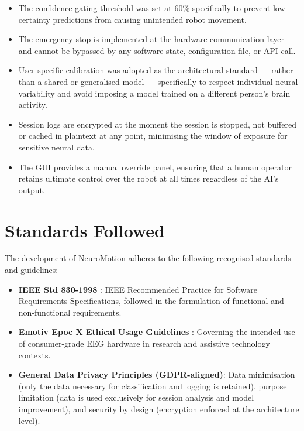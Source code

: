 \documentclass[12pt, a4paper, oneside]{report}
\begin{document}
\begin{description}
\begin{itemize}
    \item The confidence gating threshold was set at 60\% specifically to prevent
    low-certainty predictions from causing unintended robot movement.

    \item The emergency stop is implemented at the hardware communication layer and
    cannot be bypassed by any software state, configuration file, or API call.

    \item User-specific calibration was adopted as the architectural standard ---
    rather than a shared or generalised model --- specifically to respect individual
    neural variability and avoid imposing a model trained on a different person's brain
    activity.

    \item Session logs are encrypted at the moment the session is stopped, not
    buffered or cached in plaintext at any point, minimising the window of exposure
    for sensitive neural data.

    \item The GUI provides a manual override panel, ensuring that a human operator
    retains ultimate control over the robot at all times regardless of the AI's output.
\end{itemize}

\section{Standards Followed}

The development of NeuroMotion adheres to the following recognised standards and
guidelines:

\begin{itemize}
    \item \textbf{IEEE Std 830-1998} \cite{ieee830}: IEEE Recommended Practice for
    Software Requirements Specifications, followed in the formulation of functional
    and non-functional requirements.

    \item \textbf{Emotiv Epoc X Ethical Usage Guidelines} \cite{emotiv2024}:
    Governing the intended use of consumer-grade EEG hardware in research and
    assistive technology contexts.

    \item \textbf{General Data Privacy Principles (GDPR-aligned)}: Data minimisation
    (only the data necessary for classification and logging is retained), purpose
    limitation (data is used exclusively for session analysis and model improvement),
    and security by design (encryption enforced at the architecture level).
\end{itemize}


\end{description}
\end{document}

